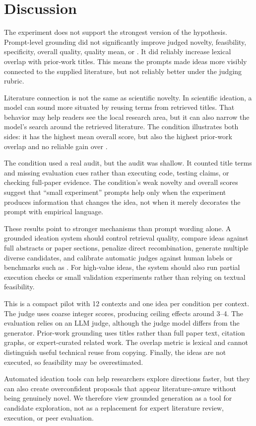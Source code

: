 \section{Discussion}
\label{sec:discussion}

 The experiment does not support the strongest version of the hypothesis. Prompt-level grounding did not significantly improve judged novelty, feasibility, specificity, overall quality, quality mean, or \nfprod. It did reliably increase lexical overlap with prior-work titles. This means the prompts made ideas more visibly connected to the supplied literature, but not reliably better under the judging rubric.

 Literature connection is not the same as scientific novelty. In scientific ideation, a model can sound more situated by reusing terms from retrieved titles. That behavior may help readers see the local research area, but it can also narrow the model's search around the retrieved literature. The \litcompare condition illustrates both sides: it has the highest mean overall score, but also the highest prior-work overlap and no reliable gain over \ungrounded.

 The \smallexperiment condition used a real audit, but the audit was shallow. It counted title terms and missing evaluation cues rather than executing code, testing claims, or checking full-paper evidence. The condition's weak novelty and overall scores suggest that ``small experiment'' prompts help only when the experiment produces information that changes the idea, not when it merely decorates the prompt with empirical language.

 These results point to stronger mechanisms than prompt wording alone. A grounded ideation system should control retrieval quality, compare ideas against full abstracts or paper sections, penalize direct recombination, generate multiple diverse candidates, and calibrate automatic judges against human labels or benchmarks such as \rinobench. For high-value ideas, the system should also run partial execution checks or small validation experiments rather than relying on textual feasibility.

 This is a compact pilot with 12 contexts and one idea per condition per context. The judge uses coarse integer scores, producing ceiling effects around 3--4. The evaluation relies on an LLM judge, although the judge model differs from the generator. Prior-work grounding uses titles rather than full paper text, citation graphs, or expert-curated related work. The overlap metric is lexical and cannot distinguish useful technical reuse from copying. Finally, the ideas are not executed, so feasibility may be overestimated.

 Automated ideation tools can help researchers explore directions faster, but they can also create overconfident proposals that appear literature-aware without being genuinely novel. We therefore view grounded generation as a tool for candidate exploration, not as a replacement for expert literature review, execution, or peer evaluation.
